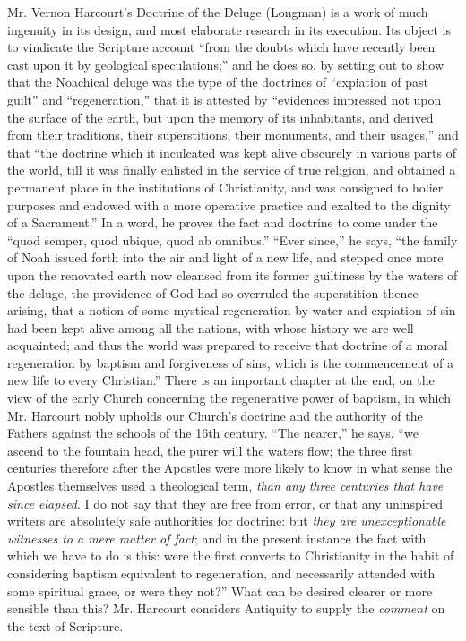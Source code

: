 Mr. Vernon Harcourt's Doctrine of the Deluge (Longman)
is a work of much ingenuity in its design, and most elaborate research
in its execution. Its object is to vindicate the Scripture account ``from
the doubts which have recently been cast upon it by geological
speculations;'' and he does so, by setting out to show that the Noachical
deluge was the type of the doctrines of ``expiation of past guilt'' and ``regeneration,''
that it is attested by ``evidences impressed not upon the surface
of the earth, but upon the memory of its inhabitants, and derived from
their traditions, their superstitions, their monuments, and their
usages,'' and that ``the doctrine which it inculcated was kept alive
obscurely in various parts of the world, till it was finally enlisted in
the service of true religion, and obtained a permanent place in the
institutions of Christianity, and was consigned to holier purposes and
endowed with a more operative practice and exalted to the dignity of a
Sacrament.'' In a word, he proves the fact and doctrine to come under the
``quod semper, quod ubique, quod ab omnibus.'' ``Ever since,'' he says, ``the
family of Noah issued forth into the air and light of a new life, and
stepped once more upon the renovated earth now cleansed from its former
guiltiness by the waters of the deluge, the providence of God had so
overruled the superstition thence arising, that a notion of some
mystical regeneration by water and expiation of sin had been kept alive
among all the nations, with whose history we are well acquainted; and
thus the world was prepared to receive that doctrine of a moral
regeneration by baptism and forgiveness of sins, which is the
commencement of a new life to every Christian.'' There is an important
chapter at the end, on the view of the early Church concerning the
regenerative power of baptism, in which Mr. Harcourt nobly upholds our
Church's doctrine and the authority of the Fathers against the schools
of the 16th century. ``The nearer,'' he says, ``we ascend to the fountain
head, the purer will the waters flow; the three first centuries
therefore after the Apostles were more likely to know in what sense the
Apostles themselves used a theological term, \emph{than any three centuries
that have since elapsed}. I do not say that they are free from error,
or that any uninspired writers are absolutely safe authorities for
doctrine: but \emph{they are unexceptionable witnesses to a mere matter of
fact}; and in the present instance the fact with which we have to do
is this: were the first converts to Christianity in the habit of
considering baptism equivalent to regeneration, and necessarily attended
with some spiritual grace, or were they not?'' What can be desired
clearer or more sensible than this? Mr. Harcourt considers Antiquity to
supply the \emph{comment} on the text of Scripture.

